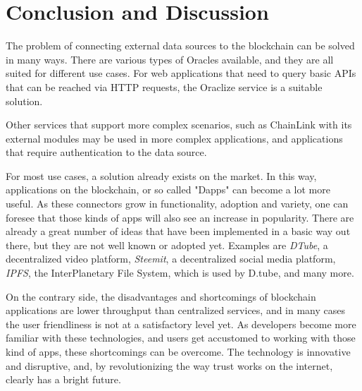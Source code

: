 \chapter{Conclusion and Discussion}
\label{cha:conclusion_and_discussion}
The problem of connecting external data sources to the blockchain can be solved in many ways. There are various types of Oracles available, and they are all suited for different use cases. For web applications that need to query basic APIs that can be reached via HTTP requests, the Oraclize service is a suitable solution.

Other services that support more complex scenarios, such as ChainLink with its external modules may be used in more complex applications, and applications that require authentication to the data source.

For most use cases, a solution already exists on the market. In this way, applications on the blockchain, or so called "Dapps" can become a lot more useful. As these connectors grow in functionality, adoption and variety, one can foresee that those kinds of apps will also see an increase in popularity. There are already a great number of ideas that have been implemented in a basic way out there, but they are not well known or adopted yet. Examples are \emph{DTube}, a decentralized video platform, \emph{Steemit}\cite{steemitwhitepaper}, a decentralized social media platform, \emph{IPFS}, the InterPlanetary File System\cite{ipfswhitepaper}, which is used by D.tube, and many more. 

On the contrary side, the disadvantages and shortcomings of blockchain applications are lower throughput than centralized services, and in many cases the user friendliness is not at a satisfactory level yet. As developers become more familiar with these technologies, and users get accustomed to working with those kind of apps, these shortcomings can be overcome. The technology is innovative and disruptive, and, by revolutionizing the way trust works on the internet, clearly has a bright future.